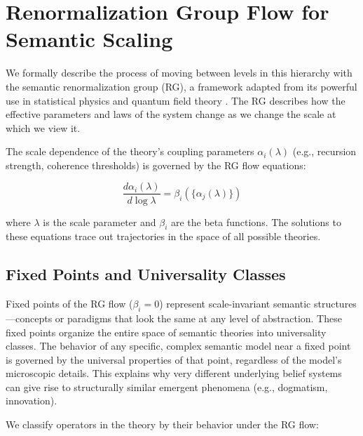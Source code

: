 
\section{Renormalization Group Flow for Semantic Scaling}
\label{15.3:renormalization_group_flow_for_semantic_scaling}

We formally describe the process of moving between levels in this hierarchy with the semantic renormalization group (RG), a framework adapted from its powerful use in statistical physics and quantum field theory \autocite{Wilson1971, Cardy1996}. The RG describes how the effective parameters and laws of the system change as we change the scale at which we view it.

The scale dependence of the theory's coupling parameters \(\alpha_i(\lambda)\) (e.g., recursion strength, coherence thresholds) is governed by the RG flow equations:

\begin{equation}
\frac{d\alpha_i(\lambda)}{d\log\lambda} = \beta_i(\{\alpha_j(\lambda)\})
\end{equation}

where \(\lambda\) is the scale parameter and \(\beta_i\) are the beta functions. The solutions to these equations trace out trajectories in the space of all possible theories.


\subsection{Fixed Points and Universality Classes}
\label{15.3.1:fixed_points_and_universality_classes}

Fixed points of the RG flow (\(\beta_i = 0\)) represent scale-invariant semantic structures—concepts or paradigms that look the same at any level of abstraction. These fixed points organize the entire space of semantic theories into universality classes. The behavior of any specific, complex semantic model near a fixed point is governed by the universal properties of that point, regardless of the model's microscopic details. This explains why very different underlying belief systems can give rise to structurally similar emergent phenomena (e.g., dogmatism, innovation).

We classify operators in the theory by their behavior under the RG flow:

